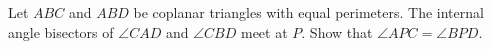 Let $ABC$ and $ABD$ be coplanar triangles with equal perimeters.  The internal angle bisectors of $\angle{CAD}$ and $\angle{CBD}$ meet at $P$. Show that $\angle{APC}=\angle{BPD}$.